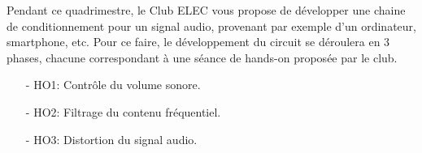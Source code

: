 Pendant ce quadrimestre, le Club ELEC vous propose de développer une chaine de conditionnement pour un signal audio, provenant par exemple d'un ordinateur, smartphone, etc. Pour ce faire, le développement du circuit se déroulera en 3 phases, chacune correspondant à une séance de hands-on proposée par le club.

\begin{itemize}
	\item[-] HO1: Contrôle du volume sonore.
	\item[-] HO2: Filtrage du contenu fréquentiel.
	\item[-] HO3: Distortion du signal audio.
\end{itemize}